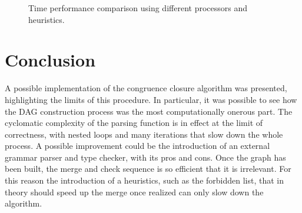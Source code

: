 \documentclass{IEEEtran}
\begin{document}
\begin{figure}[htpb]
\caption{Time performance comparison using different processors and heuristics.}
\label{fig:graph2}
\end{figure}

\section{Conclusion}
A possible implementation of the congruence closure algorithm was presented, highlighting the limits of this procedure. In particular, it was possible to see how the DAG construction process was the most computationally onerous part. The cyclomatic complexity of the parsing function is in effect at the limit of correctness, with nested loops and many iterations that slow down the whole process. A possible improvement could be the introduction of an external grammar parser and type checker, with its pros and cons. Once the graph has been built, the merge and check sequence is so efficient that it is irrelevant. For this reason the introduction of a heuristics, such as the forbidden list, that in theory should speed up the merge once realized can only slow down the algorithm.
\end{document}

